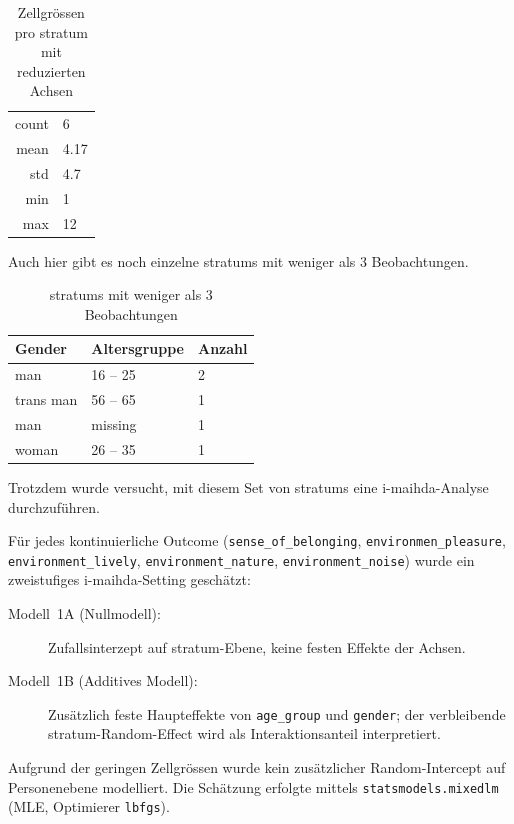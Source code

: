 \begin{table}[h]
    \centering
    \begin{tabular}{rl}
        count & 6 \\
        mean & 4.17 \\
        std & 4.7 \\
        min & 1 \\
        max & 12 \\
    \end{tabular}
    \caption{Zellgrössen pro \gls{stratum} mit reduzierten Achsen}
    \label{tab:zellgroessen_reduzierte_achsen}
\end{table}

Auch hier gibt es noch einzelne \glspl{stratum} mit weniger als 3 Beobachtungen.

\begin{table}[h]
    \centering
    \begin{tabular}{lll}
        Gender & Altersgruppe & Anzahl \\
        \hline
        man & 16 -- 25 & 2 \\
        trans man & 56 -- 65 & 1 \\
        man & missing & 1 \\
        woman & 26 -- 35 & 1 \\
    \end{tabular}
    \caption{\glspl{stratum} mit weniger als 3 Beobachtungen}
    \label{tab:zellgroessen_reduzierte_achsen_kleine_strata}
\end{table}

Trotzdem wurde versucht, mit diesem Set von \glspl{stratum} eine \gls{i-maihda}-Analyse durchzuführen.

Für jedes kontinuierliche Outcome (\texttt{sense\_of\_belonging}, \texttt{environmen\_pleasure}, \texttt{environment\_lively}, \texttt{environment\_nature}, \texttt{environment\_noise}) wurde ein zweistufiges \gls{i-maihda}-Setting geschätzt:
\begin{description}
    \item[Modell~1A (Nullmodell):] Zufallsinterzept auf \gls{stratum}-Ebene, keine festen Effekte der Achsen.
    \item[Modell~1B (Additives Modell):] Zusätzlich feste Haupteffekte von \texttt{age\_group} und \texttt{gender}; der verbleibende \gls{stratum}-Random-Effect wird als Interaktionsanteil interpretiert.
\end{description}
Aufgrund der geringen Zellgrössen wurde kein zusätzlicher Random-Intercept auf Personenebene modelliert. Die Schätzung erfolgte mittels \texttt{statsmodels.mixedlm} (MLE, Optimierer \texttt{lbfgs}).


